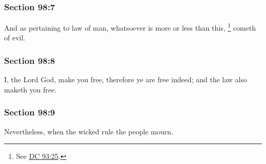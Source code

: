 	\subsubsection{Section 98:7} %
		\label{DC98-7}

		And as pertaining to law of man, whatsoever is more or less than this,%
			\footnote{%
				See \hyperref[DC93-25]{DC 93:25}.
				}
		cometh of evil.


	\subsubsection{Section 98:8} %
		\label{DC98-8}

		I, the Lord God, make you free, therefore ye are free indeed; and the law also maketh you free.


	\subsubsection{Section 98:9} %
		\label{DC98-9}

		Nevertheless, when the wicked rule the people mourn.


